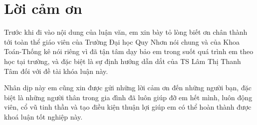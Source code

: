 \documentclass[12pt,a4paper,oneside]{report}
\numberwithin{equation}{section}
\begin{document}
\vfill
{\bf\fontsize{14pt}{16}\selectfont {Bình Định, 2023}
%
%	
%
%


\newpage
\chapter*{Lời cảm ơn}
\begin{justify}
Trước khi đi vào nội dung của luận văn, em xin bày tỏ lòng biết ơn chân thành tới toàn thể giáo viên của Trường Đại học Quy Nhơn nói chung và của Khoa Toán-Thống kê nói riêng vì đã tận tâm dạy bảo em trong suốt quá trình em theo học tại trường, và đặc biệt là sự định hướng dẫn dắt của TS Lâm Thị Thanh Tâm đối với đề tài khóa luận này.

Nhân dịp này em cũng xin được gửi những lời cảm ơn đến những người bạn, đặc biệt là những người thân trong gia đình đã luôn giúp đỡ em hết mình, luôn động viên, cổ vũ tinh thần và tạo điều kiện thuận lợi giúp em có thể hoàn thành được khoá luận tốt nghiệp này.


\end{justify}}
\end{document}
